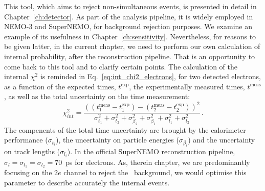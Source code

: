 This tool, which aims to reject non-simultaneous events, is presented in detail in Chapter~\ref{ch:detector}.
As part of the analysis pipeline, it is widely employed in NEMO-$3$ and SuperNEMO, for background rejection purposes.
We examine an example of its usefulness in Chapter~\ref{ch:sensitivity}.
Nevertheless, for reasons to be given latter, in the current chapter, we need to perform our own calculation of internal probability, after the reconstruction pipeline.
That is an opportunity to come back to this tool and to clarify certain points.
The calculation of the internal $\chi^{2}$ is reminded in Eq.~\eqref{eq:int_chi2_electrons}, for two detected electrons, as a function of the expected times, $t^{\text{exp}}$, the experimentally measured times, $t^{\text{meas}}$, as well as the total uncertainty on the time measurement:
\begin{equation}
  \chi^{2}_{int}=\frac{((t^{\text{meas}}_{1} - t^{\text{exp}}_{1}) - (t^{\text{meas}}_{2} - t^{\text{exp}}_{2}))^{2}}{\sigma_{t_{1}}^{2}+\sigma_{t_{2}}^{2}+\sigma_{\beta_{2}}^{2}+\sigma_{\beta_{1}}^{2}+\sigma_{l_{1}}^{2}+\sigma_{l_{2}}^{2}}\,.
  \label{eq:int_chi2_electrons}
\end{equation}
The compenents of the total time uncertainty are brought by the calorimeter performance ($\sigma_{t_{i}}$), the uncertainty on particle energies ($\sigma_{\beta_{i}}$) and the uncertainty on track lengths ($\sigma_{l_{i}}$).
In the official SuperNEMO reconstruction pipeline, ${\sigma_{l}=\sigma_{l_{1}}=\sigma_{l_{2}}=70}$~ps for electrons.
As, therein chapter, we are predominantly focusing on the $2e$ channel to reject the \Tl\ background, we would optimise this parameter to describe accurately the internal events.

